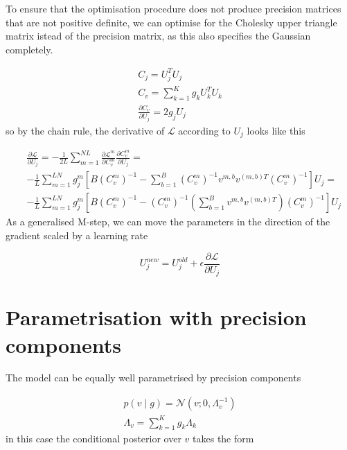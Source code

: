 \documentclass{paper}
\begin{document}
To ensure that the optimisation procedure does not produce precision matrices that are not positive definite, we can optimise for the Cholesky upper triangle matrix istead of the precision matrix, as this also specifies the Gaussian completely.

\begin{eqnarray}
C_j = U_j^T U_j \\
C_v = \sum_{k=1}^K g_k U_k^T U_k \\
\frac{\partial C_v}{\partial U_j} = 2 g_j U_j
\end{eqnarray}
%
so by the chain rule, the derivative of $\mathcal{L}$ according to $U_j$ looks like this

\begin{equation}
\begin{split}
&\frac{\partial \mathcal{L}}{\partial U_j} = -\frac{1}{2L} \sum_{m=1}^{NL} \frac{\partial \mathcal{L}^m}{\partial C_v^m} \frac{\partial C_v^m}{\partial U_j} = \\
& -\frac{1}{L} \sum_{m=1}^{LN} g_j^{m} \left[ B \left( C_v^m \right)^{-1} - \sum_{b=1}^B \left( C_v^m \right)^{-1} v^{m,b} v^{(m,b)T} \left( C_v^m \right)^{-1} \right] U_j = \\
& -\frac{1}{L} \sum_{m=1}^{LN} g_j^{m} \left[ B \left( C_v^m \right)^{-1} -  \left( C_v^m \right)^{-1} \left( \sum_{b=1}^B v^{m,b} v^{(m,b)T} \right) \left( C_v^m \right)^{-1} \right] U_j
\end{split}
\end{equation}
%
As a generalised M-step, we can move the parameters in the direction of the gradient scaled by a learning rate

\begin{equation}
U_j^{new} = U_j^{old} + \epsilon \frac{\partial \mathcal{L}}{\partial U_j}
\end{equation}

\section{Parametrisation with precision components}

The model can be equally well parametrised by precision components

\begin{eqnarray}
p(v \mid g) = \mathcal{N}(v; 0,\Lambda_v^{-1}) \\
\Lambda_v = \sum_{k=1}^K g_k \Lambda_k \label{eq:cv}
\end{eqnarray}
%
in this case the conditional posterior over $v$ takes the form
\end{document}

